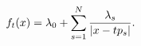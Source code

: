 \begin{equation}
f_t(x)=\lambda_0+\sum\limits_{s=1}^N{\lambda_s\over |x-tp_s|}. 
\label{skala}
\end{equation}

